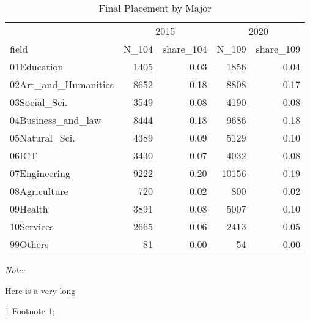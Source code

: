 \begin{table}
\centering
\caption{Final Placement by Major}
\centering
\begin{threeparttable}
\begin{tabular}[t]{lrrrr}
\toprule
\multicolumn{1}{c}{ } & \multicolumn{2}{c}{2015} & \multicolumn{2}{c}{2020} \\
\cmidrule(l{3pt}r{3pt}){2-3} \cmidrule(l{3pt}r{3pt}){4-5}
field & N\_104 & share\_104 & N\_109 & share\_109\\
\midrule
01Education & 1405 & 0.03 & 1856 & 0.04\\
02Art\_and\_Humanities & 8652 & 0.18 & 8808 & 0.17\\
03Social\_Sci. & 3549 & 0.08 & 4190 & 0.08\\
04Business\_and\_law & 8444 & 0.18 & 9686 & 0.18\\
05Natural\_Sci. & 4389 & 0.09 & 5129 & 0.10\\
\addlinespace
06ICT & 3430 & 0.07 & 4032 & 0.08\\
07Engineering & 9222 & 0.20 & 10156 & 0.19\\
08Agriculture & 720 & 0.02 & 800 & 0.02\\
09Health & 3891 & 0.08 & 5007 & 0.10\\
10Services & 2665 & 0.06 & 2413 & 0.05\\
\addlinespace
99Others & 81 & 0.00 & 54 & 0.00\\
\bottomrule
\end{tabular}
\begin{tablenotes}
\item \textit{Note: } 
\item Here is a very long
\item[1] Footnote 1; 
\end{tablenotes}
\end{threeparttable}
\end{table}
